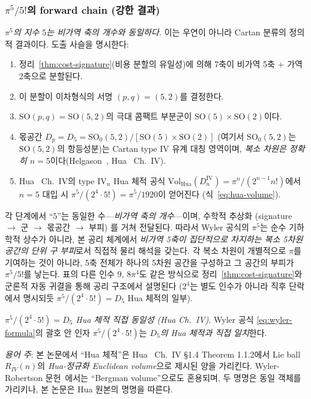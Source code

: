 \documentclass[entropy,article,submit,pdftex,oneauthor]{Definitions/mdpi}
\begin{document}
\subsubsection{$\pi^5/5!$의 forward chain (강한 결과)}

\textit{$\pi^5$의 지수 $5$는 비가역 축의 개수와 동일하다.} 이는 우연이 아니라 Cartan 분류의 정의적 결과이다. 도출 사슬을 명시한다:
\begin{enumerate}
\item 정리~\ref{thm:cost-signature}(비용 분할의 유일성)에 의해 7축이 비가역 5축 $+$ 가역 2축으로 분할된다.
\item 이 분할이 이차형식의 서명 $(p, q) = (5, 2)$를 결정한다.
\item $\mathrm{SO}(p, q) = \mathrm{SO}(5, 2)$의 극대 콤팩트 부분군이 $\mathrm{SO}(5) \times \mathrm{SO}(2)$이다.
\item 몫공간 $D_p = D_5 = \mathrm{SO}_0(5,2)/[\mathrm{SO}(5)\times\mathrm{SO}(2)]$ (여기서 $\mathrm{SO}_0(5,2)$는 $\mathrm{SO}(5,2)$의 항등성분)는 Cartan type IV 유계 대칭 영역이며, \emph{복소 차원은 정확히 $n = 5$}이다(Helgason~\cite{helgason1978}, Hua~\cite{hua1963} Ch.~IV).
\item Hua~\cite{hua1963} Ch.~IV의 type IV$_n$ Hua 체적 공식 $\mathrm{Vol}_{\text{Hua}}(D_n^{\text{IV}}) = \pi^n/(2^{n-1} n!)$에서 $n = 5$ 대입 시 $\pi^5/(2^4 \cdot 5!) = \pi^5/1920$이 얻어진다 (식~\eqref{eq:hua-volume}).
\end{enumerate}

각 단계에서 ``$5$''는 동일한 수---\emph{비가역 축의 개수}---이며, 수학적 추상화 (signature $\to$ 군 $\to$ 몫공간 $\to$ 부피) 를 거쳐 전달된다. 따라서 Wyler 공식의 $\pi^5$는 순수 기하학적 상수가 아니라, 본 공리 체계에서 \emph{비가역 5축이 집단적으로 차지하는 복소 5차원 공간의 단위 구 부피}로서 직접적 물리 해석을 갖는다. 각 복소 차원이 개별적으로 $\pi$를 기여하는 것이 아니라, 5축 전체가 하나의 5차원 공간을 구성하고 그 공간의 부피가 $\pi^5 / 5!$를 낳는다. 표의 다른 인수 $9$, $8\pi^4$도 같은 방식으로 정리~\ref{thm:cost-signature}와 군론적 자동 귀결을 통해 공리 구조에서 설명된다 ($2^4$는 별도 인수가 아니라 직후 단락에서 명시되듯 $\pi^5/(2^4\cdot 5!) = D_5$ Hua 체적의 일부).

\textit{$\pi^5/(2^4 \cdot 5!) = D_5$ Hua 체적 직접 동일성 (Hua Ch.~IV)}. Wyler 공식 \eqref{eq:wyler-formula}의 괄호 안 인자 $\pi^5/(2^4 \cdot 5!)$는 \emph{$D_5$의 Hua 체적과 직접 일치}한다.

\textit{용어 주}: 본 논문에서 ``Hua 체적''은 Hua~\cite{hua1963} Ch.~IV \S1.4 Theorem 1.1.2에서 Lie ball $R_{IV}(n)$의 \emph{Hua-정규화 Euclidean volume}으로 제시된 양을 가리킨다. Wyler-Robertson 문헌~\cite{wyler1969,robertson1971}에서는 ``Bergman volume''으로도 혼용되며, 두 명명은 동일 객체를 가리키나, 본 논문은 Hua 원본의 명명을 따른다.
\end{document}
